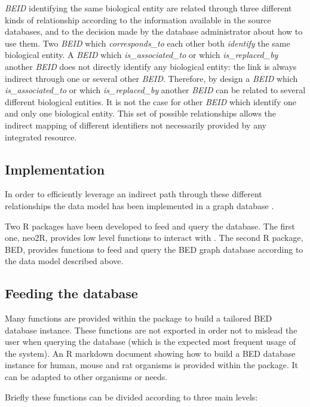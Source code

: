 \documentclass[9pt,a4paper,]{extarticle}
\theoremstyle{definition}
\theoremstyle{definition}
\theoremstyle{definition}
\theoremstyle{remark}
\begin{document}
\emph{BEID} identifying the same biological entity are related through three
different kinds of relationship according to the information available
in the source databases, and to the decision made by the database administrator
about how to use them. Two \emph{BEID} which \emph{corresponds\_to} each other both
\emph{identify} the same biological entity. A \emph{BEID} which \emph{is\_associated\_to} or
which \emph{is\_replaced\_by} another \emph{BEID} does not directly
identify any biological entity: the link is always indirect through
one or several other \emph{BEID}. Therefore, by design a \emph{BEID}
which \emph{is\_associated\_to} or which \emph{is\_replaced\_by} another \emph{BEID} can be
related to several different biological entities. It is not the case for
other \emph{BEID} which identify one and only one biological entity.
This set of possible relationships allows the indirect mapping of
different identifiers not necessarily provided by any integrated resource.

\subsection{Implementation}\label{implementation}

In order to efficiently leverage an indirect path through these different
relationships the data model has been implemented in
a \neo{} graph database \citep{neo4j_inc_neo4j_2017}.

Two R \citep{r_core_team_r:_2017} packages have been developed to feed and query
the database.
The first one, neo2R, provides low level functions to interact with
\neo{}. The second R package, BED,
provides functions to feed and query the BED
\neo{} graph database according to the
data model described above.

\subsection{Feeding the database}\label{feeding-the-database}

Many functions are provided within the package to build a tailored BED database
instance. These functions are not exported in order not to mislead
the user when querying the database (which is the expected most frequent
usage of the system). An R markdown document showing how to build a BED database
instance for human, mouse and rat organisms is provided within the
package. It can be adapted to other organisms or needs.

Briefly these functions can be divided according to three main levels:
\end{document}
